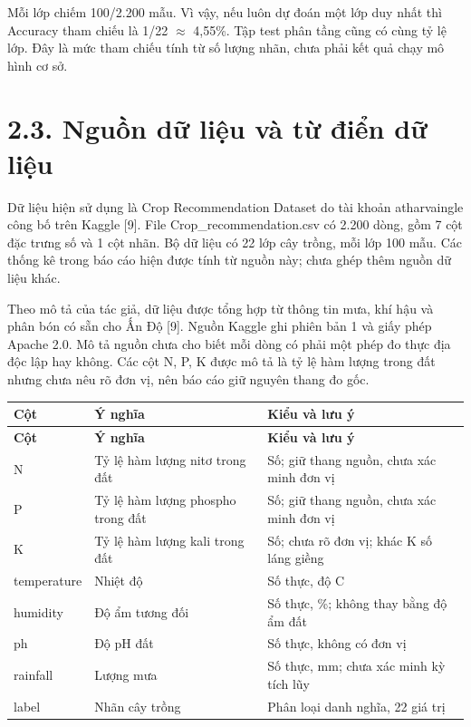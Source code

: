 Mỗi lớp chiếm 100/2.200 mẫu. Vì vậy, nếu luôn dự đoán một lớp duy nhất thì Accuracy tham chiếu là 1/22 \ensuremath{\approx} 4,55\%. Tập test phân tầng cũng có cùng tỷ lệ lớp. Đây là mức tham chiếu tính từ số lượng nhãn, chưa phải kết quả chạy mô hình cơ sở.


\clearpage

\section{2.3. Nguồn dữ liệu và từ điển dữ liệu}

Dữ liệu hiện sử dụng là Crop Recommendation Dataset do tài khoản atharvaingle công bố trên Kaggle [9]. File Crop\_recommendation.csv có 2.200 dòng, gồm 7 cột đặc trưng số và 1 cột nhãn. Bộ dữ liệu có 22 lớp cây trồng, mỗi lớp 100 mẫu. Các thống kê trong báo cáo hiện được tính từ nguồn này; chưa ghép thêm nguồn dữ liệu khác.


Theo mô tả của tác giả, dữ liệu được tổng hợp từ thông tin mưa, khí hậu và phân bón có sẵn cho Ấn Độ [9]. Nguồn Kaggle ghi phiên bản 1 và giấy phép Apache 2.0. Mô tả nguồn chưa cho biết mỗi dòng có phải một phép đo thực địa độc lập hay không. Các cột N, P, K được mô tả là tỷ lệ hàm lượng trong đất nhưng chưa nêu rõ đơn vị, nên báo cáo giữ nguyên thang đo gốc.


\begingroup
{}
\label{tab:2}
\fontsize{11.5}{13.5}\selectfont{}
\renewcommand{\arraystretch}{1.15}
\begin{longtable*}{|>{\raggedright\arraybackslash}p{\arrayrulewidth\relax}|>{\raggedright\arraybackslash}p{\arrayrulewidth\relax}|>{\raggedright\arraybackslash}p{\arrayrulewidth\relax}|}
\hline \textbf{Cột} & \textbf{Ý nghĩa} & \textbf{Kiểu và lưu ý} \\ \hline
\endfirsthead
\hline \textbf{Cột} & \textbf{Ý nghĩa} & \textbf{Kiểu và lưu ý} \\ \hline
\endhead
N & Tỷ lệ hàm lượng nitơ trong đất & Số; giữ thang nguồn, chưa xác minh đơn vị \\ \hline
P & Tỷ lệ hàm lượng phospho trong đất & Số; giữ thang nguồn, chưa xác minh đơn vị \\ \hline
K & Tỷ lệ hàm lượng kali trong đất & Số; chưa rõ đơn vị; khác K số láng giềng \\ \hline
temperature & Nhiệt độ & Số thực, độ C \\ \hline
humidity & Độ ẩm tương đối & Số thực, \%; không thay bằng độ ẩm đất \\ \hline
ph & Độ pH đất & Số thực, không có đơn vị \\ \hline
rainfall & Lượng mưa & Số thực, mm; chưa xác minh kỳ tích lũy \\ \hline
label & Nhãn cây trồng & Phân loại danh nghĩa, 22 giá trị \\ \hline
\end{longtable*}
\endgroup


